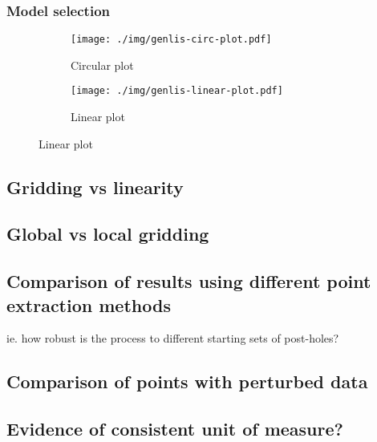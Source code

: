 \documentclass[../../ArchStats.tex]{subfiles}
\begin{document}
\subsubsection{Model selection}



\begin{figure}
\centering
\caption{Transformed angles $\boldsymbol{\theta}$ with densities of candidate models}
\begin{subfigure}[t]{0.45\textwidth}
\caption{Circular plot}
\texttt{[image: ./img/genlis-circ-plot.pdf]}
\end{subfigure}
\begin{subfigure}[t]{0.45\textwidth}
\caption{Linear plot}
\texttt{[image: ./img/genlis-linear-plot.pdf]}
\end{subfigure}
\end{figure}


\subsection{Gridding vs linearity}



\subsection{Global vs local gridding}

\subsection{Comparison of results using different point extraction methods}
ie. how robust is the process to different starting sets of post-holes?

\subsection{Comparison of points with perturbed data}


\subsection{Evidence of consistent unit of measure?}
\end{document}
